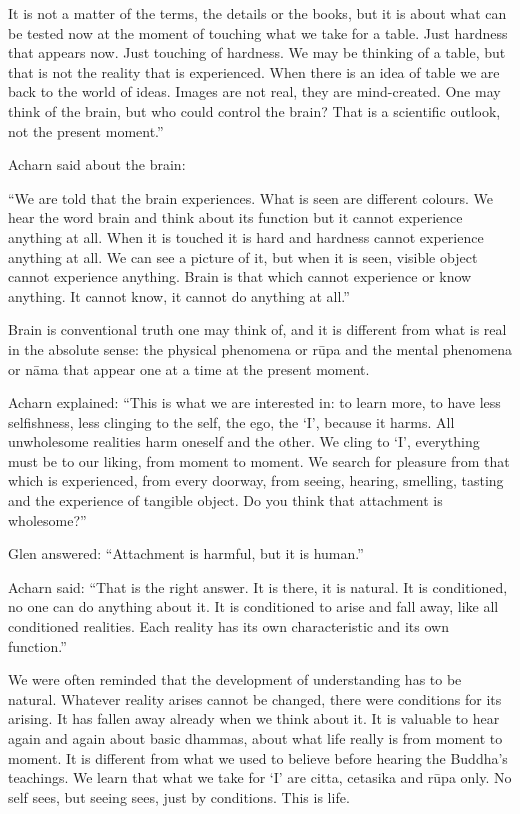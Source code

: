 It is not a matter of the terms, the details or the books, but it is
about what can be tested now at the moment of touching what we take for
a table. Just hardness that appears now. Just touching of hardness. We
may be thinking of a table, but that is not the reality that is
experienced. When there is an idea of table we are back to the world of
ideas. Images are not real, they are mind-created. One may think of the
brain, but who could control the brain? That is a scientific outlook,
not the present moment.''

Acharn said about the brain:

``We are told that the brain experiences. What is seen are different
colours. We hear the word brain and think about its function but it
cannot experience anything at all. When it is touched it is hard and
hardness cannot experience anything at all. We can see a picture of it,
but when it is seen, visible object cannot experience anything. Brain is
that which cannot experience or know anything. It cannot know, it cannot
do anything at all.''

Brain is conventional truth one may think of, and it is different from
what is real in the absolute sense: the physical phenomena or rūpa and
the mental phenomena or nāma that appear one at a time at the present
moment.

Acharn explained: ``This is what we are interested in: to learn more, to
have less selfishness, less clinging to the self, the ego, the `I',
because it harms. All unwholesome realities harm oneself and the other.
We cling to `I', everything must be to our liking, from moment to
moment. We search for pleasure from that which is experienced, from
every doorway, from seeing, hearing, smelling, tasting and the
experience of tangible object. Do you think that attachment is
wholesome?''

Glen answered: ``Attachment is harmful, but it is human.''

Acharn said: ``That is the right answer. It is there, it is natural. It
is conditioned, no one can do anything about it. It is conditioned to
arise and fall away, like all conditioned realities. Each reality has
its own characteristic and its own function.''

We were often reminded that the development of understanding has to be
natural. Whatever reality arises cannot be changed, there were
conditions for its arising. It has fallen away already when we think
about it. It is valuable to hear again and again about basic dhammas,
about what life really is from moment to moment. It is different from
what we used to believe before hearing the Buddha's teachings. We learn
that what we take for `I' are citta, cetasika and rūpa only. No self
sees, but seeing sees, just by conditions. This is life.



